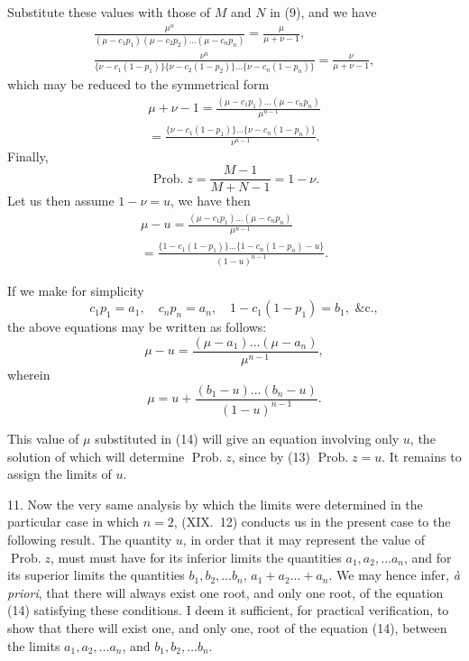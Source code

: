 \documentclass[oneside]{book}
\begin{document}
Substitute these values with those of $M$ and $N$ in (9), and
we have
\begin{gather*}
\frac{\mu^n}{(\mu-c_1 p_1)(\mu-c_2 p_2) \dotsc (\mu - c_n p_n)} =\frac{\mu}{\mu + \nu -1}, \\
\frac{\nu^n}{ \{\nu-c_1(1-p_1)\} \{\nu-c_2(1-p_2)\} \dotsc \{\nu-c_n(1-p_n)\} } =\frac{\nu}{\mu+\nu-1},
\end{gather*}
which may be reduced to the symmetrical form
\begin{equation*}\tag{12}\begin{split}
  \mu+\nu-1=\frac{(\mu-c_1 p_1) \dotsc (\mu - c_n p_n)}{\mu^{n-1}} \\
= \frac{ \{\nu-c_1(1-p_1)\} \dotsc \{\nu-c_n(1-p_n)\} }{\nu^{n-1}}.
\end{split}\end{equation*}
Finally,
\begin{equation*}\tag{13}
\operatorname{Prob. } z = \frac{M-1}{M+N-1}=1-\nu.
\end{equation*}
Let us then assume $1-\nu = u$, we have then
\begin{gather*}
\mu - u = \frac{(\mu-c_1 p_1) \dotsc (\mu-c_n p_n)}{\mu^{n-1}} \\
= \frac{ \{1-c_1(1-p_1)\} \dotsc \{1-c_n(1-p_n)-u\} }{(1-u)^{n-1}}.
\end{gather*}

If we make for simplicity
\begin{equation*}
c_1 p_1 = a_1, \quad c_n p_n=a_n, \quad 1-c_1(1-p_1)=b_1,\text{ \&c.},
\end{equation*}
the above equations may be written as follows:
\begin{equation}\tag{14}
\mu - u = \frac{(\mu - a_1) \dotsc (\mu - a_n)}{\mu^{n-1}},
\end{equation}
wherein
\begin{equation}\tag{15}
\mu = u + \frac{(b_1 - u) \dotsc (b_n - u)}{(1-u)^{n-1}}.
\end{equation}

This value of $\mu$ substituted in (14) will give an equation
involving only $u$, the solution of which will determine $\operatorname{Prob. } z$,
since by (13) $\operatorname{Prob. } z = u$. It remains to assign the limits of $u$.

11. Now the very same analysis by which the limits were
determined in the particular case in which $n = 2$, (XIX.~12)
conducts us in the present case to the following result. The
quantity $u$, in order that it may represent the value of $\operatorname{Prob. } z$, must
must have for its inferior limits the quantities $a_1, a_2, \dotsc a_n$, and
for its superior limits the quantities $b_1, b_2,\dotsc b_n$, $a_1 + a_2 \dotsc + a_n$.
We may hence infer, \textit{\`{a} priori}, that there will always exist one
root, and only one root, of the equation (14) satisfying these
conditions. I deem it sufficient, for practical verification, to show
that there will exist one, and only one, root of the equation (14),
between the limits $a_1, a_2, \dotsc a_n$, and $b_1, b_2,\dotsc b_n$.
\end{document}
